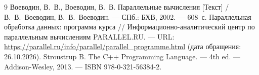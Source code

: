 \documentclass[14pt,a4paper]{extarticle}
\numberwithin{equation}{section}
\numberwithin{figure}{section}
\numberwithin{table}{section}
\begin{document}
\clearpage{}
{}
\begingroup
\renewcommand{\refname}{СПИСОК ИСПОЛЬЗОВАННЫХ ИСТОЧНИКОВ}
\titlespacing*{\section}{0pt}{0pt}{1em}
\begin{thebibliography}{9}\sloppy
{} Воеводин, В.~В., Воеводин, В.~В. Параллельные вычисления [Текст] / В.~В.~Воеводин, В.~В.~Воеводин. --- СПб.: БХВ, 2002. --- 608~с.
 Параллельная обработка данных: программа курса // Информационно-аналитический центр по параллельным вычислениям PARALLEL.RU. --- URL: \url{https://parallel.ru/info/parallel/parallel_programme.html} (дата обращения: 26.10.2026).
 Stroustrup B. The C++ Programming Language. --- 4th ed. --- Addison-Wesley, 2013. --- ISBN 978-0-321-56384-2.
\end{thebibliography}
\endgroup
\end{document}
